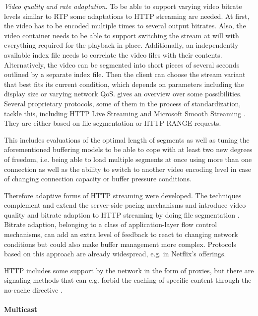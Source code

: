 \textit{Video quality and rate adaptation}. To be able to support varying video bitrate levels similar to \gls{RTP} some adaptations to \gls{HTTP} streaming are needed. At first, the video has to be encoded multiple times to several output bitrates. Also, the video container needs to be able to support switching the stream at will with everything required for the playback in place. Additionally, an independently available index file needs to correlate the video files with their contents. Alternatively, the video can be segmented into short pieces of several seconds outlined by a separate index file. Then the client can choose the stream variant that best fits its current condition, which depends on parameters including the display size or varying network \gls{QoS}. \cite{ma2011mobile} gives an overview over some possibilities. Several proprietary protocols, some of them in the process of standardization, tackle this, including \gls{HTTP} Live Streaming \cite{pantos2011livestreaming} and Microsoft Smooth Streaming \cite{zambelli_iis_2009}. They are either based on file segmentation or HTTP RANGE requests. 


This includes evaluations of the optimal length of segments as well as tuning the aforementioned buffering models to be able to cope with at least two new degrees of freedom, i.e. being able to load multiple segments at once using more than one connection as well as the ability to switch to another video encoding level in case of changing connection capacity or buffer pressure conditions.


Therefore adaptive forms of \gls{HTTP} streaming were developed. The techniques complement and extend the server-side pacing mechanisms and introduce video quality and bitrate adaption to \gls{HTTP} streaming by doing file segmentation \cite{ma2011mobile, watching-video1}. Bitrate adaption, belonging to a class of application-layer flow control mechanisms, can add an extra level of feedback to react to changing network conditions but could also make buffer management more complex. Protocols based on this approach are already widespread, e.g. in Netflix's offerings.



HTTP includes some support by the network in the form of proxies, but there are signaling methods that can e.g. forbid the caching of specific content through the no-cache directive \cite{rfc2616}.


\paragraph{Multicast}

